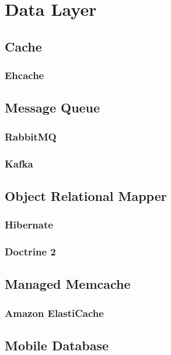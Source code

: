 \chapter{Data Layer}\label{ch:ch5label}

\section{Cache} 

\subsection{Ehcache}

\section{Message Queue}
\subsection{RabbitMQ}
\subsection{Kafka}

\section{Object Relational Mapper}
\subsection{Hibernate}
\subsection{Doctrine 2}



\section{Managed Memcache}

\subsection{Amazon ElastiCache}


\section{Mobile Database}

